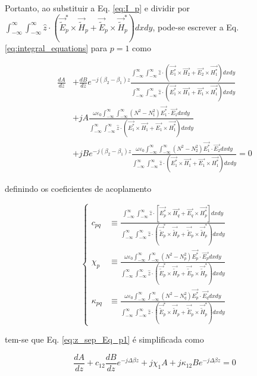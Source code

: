 \documentclass[final,12pt,times,twocolumn]{elsarticle}
\newcommand{\tildee}{ \vec{\tilde{E}}}
\newcommand{\tildeh}{ \vec{\tilde{H}}}
\newcommand{\epsz}{\varepsilon_0}
\newcommand{\couplingdenom}{ \int_{-\infty}^\infty \int_{-\infty}^\infty \hat{z}\cdot\left(\tildee_p^*\times\tildeh_p+\tildee_p\times\tildeh_p^*\right) dxdy }
\begin{document}
Portanto, ao substituir a Eq. \eqref{eq:I_p} e dividir por $ \couplingdenom $, pode-se escrever a Eq. \eqref{eq:integral_equations} para $p=1$ como

\begin{equation} 
    \begin{split}
        \frac{dA}{dz} &+ \frac{dB}{dz}e^{-j(\beta_2-\beta_1)z}\frac{\int_{-\infty}^\infty\int_{-\infty}^\infty \hat{z}\cdot\left( \vec{E_1^*}\times\vec{H_2} + \vec{E_2}\times\vec{H_1^*} \right) dxdy}{\int_{-\infty}^\infty\int_{-\infty}^\infty \hat{z}\cdot\left( \vec{E_1^*}\times\vec{H_1} + \vec{E_1}\times\vec{H_1^*} \right) dxdy} \\
        &+ jA \frac{\omega\epsz  \int_{-\infty}^\infty\int_{-\infty}^\infty \left(N^2-N_1^2\right)\vec{E_1^*}\cdot\vec{E_1} dxdy}{\int_{-\infty}^\infty\int_{-\infty}^\infty \hat{z}\cdot\left( \vec{E_1^*}\times\vec{H_1} + \vec{E_1}\times\vec{H_1^*} \right) dxdy} \\
        &+ jBe^{-j(\beta_2-\beta_1)z} \frac{\omega\epsz  \int_{-\infty}^\infty\int_{-\infty}^\infty \left(N^2-N_2^2\right)\vec{E_1^*}\cdot\vec{E_2} dxdy}{\int_{-\infty}^\infty\int_{-\infty}^\infty \hat{z}\cdot\left( \vec{E_1^*}\times\vec{H_1} + \vec{E_1}\times\vec{H_1^*} \right) dxdy} = 0
    \end{split}
    \label{eq:z_sep_Eq_p1}
\end{equation}

\noindent definindo os coeficientes de acoplamento

\begin{equation}
    \left\{
    \begin{split}
        c_{pq} &\equiv \frac{\int_{-\infty}^\infty\int_{-\infty}^\infty \hat{z} \cdot \left[ \vec{E_p^*}\times\vec{H_q} + \vec{E_q}\times\vec{H_p^*} \right] dxdy}{\couplingdenom} \\
        \chi_{p} &\equiv \frac{\omega\epsz\int_{-\infty}^\infty\int_{-\infty}^\infty \left(N^2-N_p^2\right) \vec{E_p^*}\cdot\vec{E_p} dxdy}{\couplingdenom} \\
        \kappa_{pq} &\equiv \frac{\omega\epsz\int_{-\infty}^\infty\int_{-\infty}^\infty \left(N^2-N_q^2\right) \vec{E_p^*}\cdot\vec{E_q} dxdy}{\couplingdenom}
    \end{split} 
    \right.
    \label{eq:coupling_coeff}
\end{equation}

tem-se que Eq. \eqref{eq:z_sep_Eq_p1} é simplificada como

\begin{equation}
    \frac{dA}{dz} + c_{12}\frac{dB}{dz}e^{-j\Delta\beta z} + j\chi_1A + j\kappa_{12}Be^{-j\Delta\beta z} = 0
\end{equation}
\end{document}
